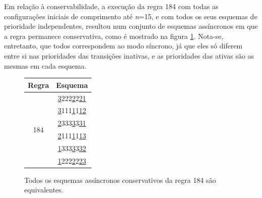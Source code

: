 \documentclass[a4paper,12pt]{ltxdoc}
\newcommand\tab[1][1cm]{\hspace*{#1}}
\begin{document}
\tab Em relação à conservabilidade, a execução da regra 184 com todas as configurações iniciais de comprimento até \textit{n}=15, e com todos os seus esquemas de prioridade independentes, resultou num conjunto de esquemas assíncronos em que a regra permanece conservativa, como é mostrado na figura \ref{fig:evolucoes}. Nota-se, entretanto, que todos correspondem ao modo síncrono, já que eles só diferem entre si nas prioridades das transições inativas, e as prioridades das ativas são as mesmas em cada esquema.

\begin{figure}[h]
  \begin{minipage}[htb]{.5\linewidth}
    \centering
    \caption{Todos os esquemas assíncronos conservativos da regra 184 são equivalentes.}
    \label{fig:evolucoes}
  \end{minipage}%
  \begin{minipage}[htb]{.6\linewidth}
    \centering
    \begin{tabular}{ | c | c | } \hline
      Regra & Esquema  \\\hline 
      \multirow{13}{*}{184} 
	    & \underline{3}222\underline{2}2\underline{21} \\
	    & \underline{3}111\underline{1}1\underline{12} \\      
	    & \underline{2}333\underline{3}3\underline{31} \\      
	    & \underline{2}111\underline{1}1\underline{13} \\      
	    & \underline{1}333\underline{3}3\underline{32} \\      
	    & \underline{1}222\underline{2}2\underline{23} \\      

\end{tabular}
\end{minipage}
\end{figure}
\end{document}
